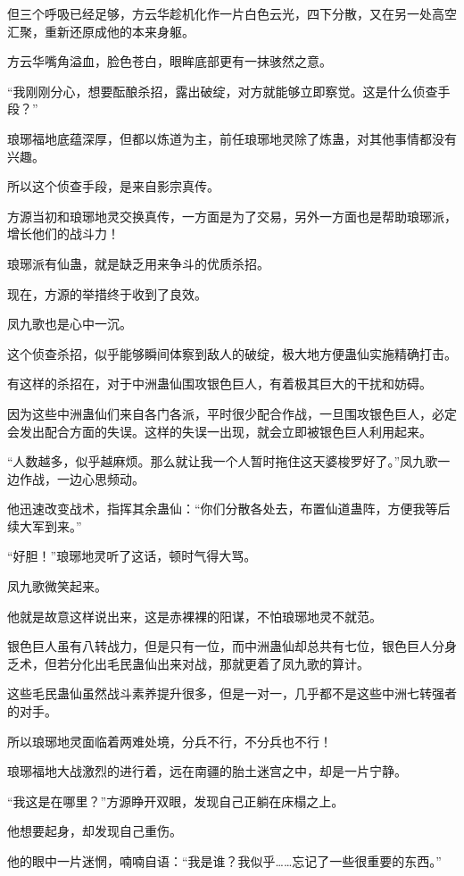 \begin{this_body}
但三个呼吸已经足够，方云华趁机化作一片白色云光，四下分散，又在另一处高空汇聚，重新还原成他的本来身躯。

方云华嘴角溢血，脸色苍白，眼眸底部更有一抹骇然之意。

“我刚刚分心，想要酝酿杀招，露出破绽，对方就能够立即察觉。这是什么侦查手段？”

琅琊福地底蕴深厚，但都以炼道为主，前任琅琊地灵除了炼蛊，对其他事情都没有兴趣。

所以这个侦查手段，是来自影宗真传。

方源当初和琅琊地灵交换真传，一方面是为了交易，另外一方面也是帮助琅琊派，增长他们的战斗力！

琅琊派有仙蛊，就是缺乏用来争斗的优质杀招。

现在，方源的举措终于收到了良效。

凤九歌也是心中一沉。

这个侦查杀招，似乎能够瞬间体察到敌人的破绽，极大地方便蛊仙实施精确打击。

有这样的杀招在，对于中洲蛊仙围攻银色巨人，有着极其巨大的干扰和妨碍。

因为这些中洲蛊仙们来自各门各派，平时很少配合作战，一旦围攻银色巨人，必定会发出配合方面的失误。这样的失误一出现，就会立即被银色巨人利用起来。

“人数越多，似乎越麻烦。那么就让我一个人暂时拖住这天婆梭罗好了。”凤九歌一边作战，一边心思频动。

他迅速改变战术，指挥其余蛊仙：“你们分散各处去，布置仙道蛊阵，方便我等后续大军到来。”

“好胆！”琅琊地灵听了这话，顿时气得大骂。

凤九歌微笑起来。

他就是故意这样说出来，这是赤裸裸的阳谋，不怕琅琊地灵不就范。

银色巨人虽有八转战力，但是只有一位，而中洲蛊仙却总共有七位，银色巨人分身乏术，但若分化出毛民蛊仙出来对战，那就更着了凤九歌的算计。

这些毛民蛊仙虽然战斗素养提升很多，但是一对一，几乎都不是这些中洲七转强者的对手。

所以琅琊地灵面临着两难处境，分兵不行，不分兵也不行！

琅琊福地大战激烈的进行着，远在南疆的胎土迷宫之中，却是一片宁静。

“我这是在哪里？”方源睁开双眼，发现自己正躺在床榻之上。

他想要起身，却发现自己重伤。

他的眼中一片迷惘，喃喃自语：“我是谁？我似乎……忘记了一些很重要的东西。”


\end{this_body}
